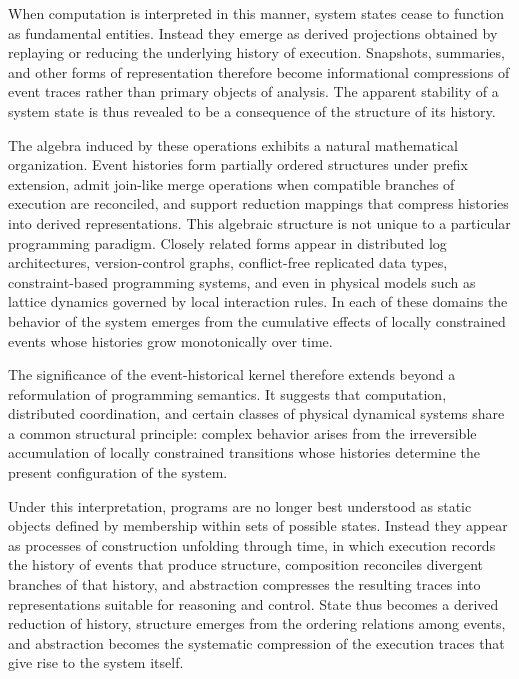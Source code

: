 \documentclass[12pt]{article}
\begin{document}
When computation is interpreted in this manner, system states
cease to function as fundamental entities. Instead they emerge
as derived projections obtained by replaying or reducing the
underlying history of execution. Snapshots, summaries, and
other forms of representation therefore become informational
compressions of event traces rather than primary objects of
analysis. The apparent stability of a system state is thus
revealed to be a consequence of the structure of its history.

The algebra induced by these operations exhibits a natural
mathematical organization. Event histories form partially
ordered structures under prefix extension, admit join-like
merge operations when compatible branches of execution are
reconciled, and support reduction mappings that compress
histories into derived representations. This algebraic
structure is not unique to a particular programming paradigm.
Closely related forms appear in distributed log architectures,
version-control graphs, conflict-free replicated data types,
constraint-based programming systems, and even in physical
models such as lattice dynamics governed by local interaction
rules. In each of these domains the behavior of the system
emerges from the cumulative effects of locally constrained
events whose histories grow monotonically over time.

The significance of the event-historical kernel therefore
extends beyond a reformulation of programming semantics.
It suggests that computation, distributed coordination,
and certain classes of physical dynamical systems share a
common structural principle: complex behavior arises from
the irreversible accumulation of locally constrained
transitions whose histories determine the present
configuration of the system.

Under this interpretation, programs are no longer best
understood as static objects defined by membership within
sets of possible states. Instead they appear as processes
of construction unfolding through time, in which execution
records the history of events that produce structure,
composition reconciles divergent branches of that history,
and abstraction compresses the resulting traces into
representations suitable for reasoning and control.
State thus becomes a derived reduction of history,
structure emerges from the ordering relations among events,
and abstraction becomes the systematic compression of the
execution traces that give rise to the system itself.

\newpage
\end{document}
